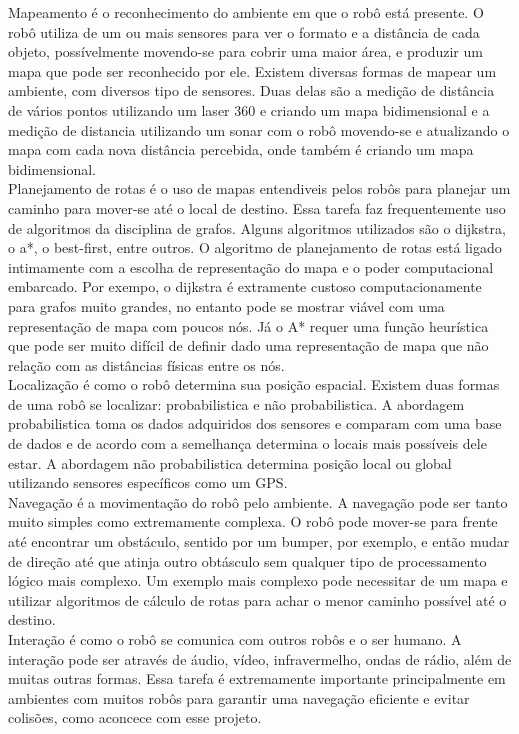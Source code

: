 \documentclass{article}
\begin{document}
Mapeamento é o reconhecimento do ambiente em que o robô está presente. O robô utiliza de um ou mais sensores para ver o formato e a distância de cada objeto, possívelmente movendo-se para cobrir uma maior área, e produzir um mapa que pode ser reconhecido por ele. Existem diversas formas de mapear um ambiente, com diversos tipo de sensores. Duas delas são a medição de distância de vários pontos utilizando um laser 360 e criando um mapa bidimensional e a medição de distancia utilizando um sonar com o robô movendo-se e atualizando o mapa com cada nova distância percebida, onde também é criando um mapa bidimensional.\\ 

Planejamento de rotas é o uso de mapas entendiveis pelos robôs para planejar um caminho para mover-se até o local de destino. Essa tarefa faz frequentemente uso de algoritmos da disciplina de grafos. Alguns algoritmos utilizados são o dijkstra, o a*, o best-first, entre outros. O algoritmo de planejamento de rotas está ligado intimamente com a escolha de representação do mapa e o poder computacional embarcado. Por exempo, o dijkstra é extramente custoso computacionamente para grafos muito grandes, no entanto pode se mostrar viável com uma representação de mapa com poucos nós. Já o A* requer uma função heurística que pode ser muito difícil de definir dado uma representação de mapa que não relação com as distâncias físicas entre os nós.\\

Localização é como o robô determina sua posição espacial. Existem duas formas de uma robô se localizar: probabilistica e não probabilistica. A abordagem probabilistica toma os dados adquiridos dos sensores e comparam com uma base de dados e de acordo com a semelhança determina o locais mais possíveis dele estar. A abordagem não probabilistica determina posição local ou global utilizando sensores específicos como um GPS.\\

Navegação é a movimentação do robô pelo ambiente. A navegação pode ser tanto muito simples como extremamente complexa. O robô pode mover-se para frente até encontrar um obstáculo, sentido por um bumper, por exemplo, e então mudar de direção até que atinja outro obtásculo sem qualquer tipo de processamento lógico mais complexo. Um exemplo mais complexo pode necessitar de um mapa e utilizar algoritmos de cálculo de rotas para achar o menor caminho possível até o destino.\\

Interação é como o robô se comunica com outros robôs e o ser humano. A interação pode ser através de áudio, vídeo, infravermelho, ondas de rádio, além de muitas outras formas. Essa tarefa é extremamente importante principalmente em ambientes com muitos robôs para garantir uma navegação eficiente e evitar colisões, como aconcece com esse projeto.\\
\end{document}
